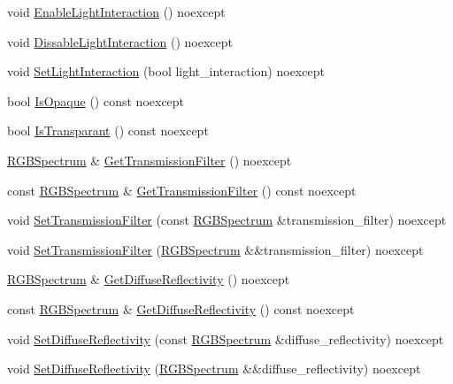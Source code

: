 \begin{DoxyCompactItemize}
void \hyperlink{structmage_1_1_material_abbcdcc3a9cb44c854212508c8419aa7f}{Enable\+Light\+Interaction} () noexcept
\item 
void \hyperlink{structmage_1_1_material_ab4b92a53ee74e401c518eea299fb4e0b}{Dissable\+Light\+Interaction} () noexcept
\item 
void \hyperlink{structmage_1_1_material_a9b0bcb448cf9c96bcb63dcbc0f110bd1}{Set\+Light\+Interaction} (bool light\+\_\+interaction) noexcept
\item 
bool \hyperlink{structmage_1_1_material_a0df1804c29bfd9d2bbc606d6285dccec}{Is\+Opaque} () const noexcept
\item 
bool \hyperlink{structmage_1_1_material_a6a62e3889887e77259070e1f9cd9150f}{Is\+Transparant} () const noexcept
\item 
\hyperlink{structmage_1_1_r_g_b_spectrum}{R\+G\+B\+Spectrum} \& \hyperlink{structmage_1_1_material_aba949cb74176530638c7bcb100882196}{Get\+Transmission\+Filter} () noexcept
\item 
const \hyperlink{structmage_1_1_r_g_b_spectrum}{R\+G\+B\+Spectrum} \& \hyperlink{structmage_1_1_material_a38071483e6d47eedb02b2e5c912073e7}{Get\+Transmission\+Filter} () const noexcept
\item 
void \hyperlink{structmage_1_1_material_afe8121e13eb9fff9ffb281e7c807f2e0}{Set\+Transmission\+Filter} (const \hyperlink{structmage_1_1_r_g_b_spectrum}{R\+G\+B\+Spectrum} \&transmission\+\_\+filter) noexcept
\item 
void \hyperlink{structmage_1_1_material_abc6f63bd40b00c81bc799ef1f2ca01e9}{Set\+Transmission\+Filter} (\hyperlink{structmage_1_1_r_g_b_spectrum}{R\+G\+B\+Spectrum} \&\&transmission\+\_\+filter) noexcept
\item 
\hyperlink{structmage_1_1_r_g_b_spectrum}{R\+G\+B\+Spectrum} \& \hyperlink{structmage_1_1_material_afb37e1cd37df82b6607a4e5998e58ea8}{Get\+Diffuse\+Reflectivity} () noexcept
\item 
const \hyperlink{structmage_1_1_r_g_b_spectrum}{R\+G\+B\+Spectrum} \& \hyperlink{structmage_1_1_material_a046b0d8eece74bd68538fefd03c1f294}{Get\+Diffuse\+Reflectivity} () const noexcept
\item 
void \hyperlink{structmage_1_1_material_aef82ef4eba08eabc31989144316a57c6}{Set\+Diffuse\+Reflectivity} (const \hyperlink{structmage_1_1_r_g_b_spectrum}{R\+G\+B\+Spectrum} \&diffuse\+\_\+reflectivity) noexcept
\item 
void \hyperlink{structmage_1_1_material_a83281d9408fcdc3c6de6804f31a527b3}{Set\+Diffuse\+Reflectivity} (\hyperlink{structmage_1_1_r_g_b_spectrum}{R\+G\+B\+Spectrum} \&\&diffuse\+\_\+reflectivity) noexcept

\end{DoxyCompactItemize}
